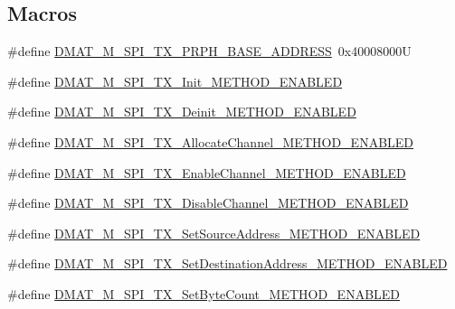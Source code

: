 \subsection*{Macros}
\begin{DoxyCompactItemize}
\item 
\#define \hyperlink{group___d_m_a_t___m___s_p_i___t_x__module_ga7a5e8ef1ce59e0e4c2a0d43bda518ae5}{D\-M\-A\-T\-\_\-\-M\-\_\-\-S\-P\-I\-\_\-\-T\-X\-\_\-\-P\-R\-P\-H\-\_\-\-B\-A\-S\-E\-\_\-\-A\-D\-D\-R\-E\-S\-S}~0x40008000\-U
\item 
\#define \hyperlink{group___d_m_a_t___m___s_p_i___t_x__module_gaebc972f6200b81ef32abe30c54acffbb}{D\-M\-A\-T\-\_\-\-M\-\_\-\-S\-P\-I\-\_\-\-T\-X\-\_\-\-Init\-\_\-\-M\-E\-T\-H\-O\-D\-\_\-\-E\-N\-A\-B\-L\-E\-D}
\item 
\#define \hyperlink{group___d_m_a_t___m___s_p_i___t_x__module_ga31d35c0e1df4d44d432f41e8b4aaeda8}{D\-M\-A\-T\-\_\-\-M\-\_\-\-S\-P\-I\-\_\-\-T\-X\-\_\-\-Deinit\-\_\-\-M\-E\-T\-H\-O\-D\-\_\-\-E\-N\-A\-B\-L\-E\-D}
\item 
\#define \hyperlink{group___d_m_a_t___m___s_p_i___t_x__module_gaf3808df46dd61db9302702ba2cdf30a6}{D\-M\-A\-T\-\_\-\-M\-\_\-\-S\-P\-I\-\_\-\-T\-X\-\_\-\-Allocate\-Channel\-\_\-\-M\-E\-T\-H\-O\-D\-\_\-\-E\-N\-A\-B\-L\-E\-D}
\item 
\#define \hyperlink{group___d_m_a_t___m___s_p_i___t_x__module_gaf6459aebab1f30b957070cf24f723359}{D\-M\-A\-T\-\_\-\-M\-\_\-\-S\-P\-I\-\_\-\-T\-X\-\_\-\-Enable\-Channel\-\_\-\-M\-E\-T\-H\-O\-D\-\_\-\-E\-N\-A\-B\-L\-E\-D}
\item 
\#define \hyperlink{group___d_m_a_t___m___s_p_i___t_x__module_ga89ea86f3b13941143f02f1d0e9e4044a}{D\-M\-A\-T\-\_\-\-M\-\_\-\-S\-P\-I\-\_\-\-T\-X\-\_\-\-Disable\-Channel\-\_\-\-M\-E\-T\-H\-O\-D\-\_\-\-E\-N\-A\-B\-L\-E\-D}
\item 
\#define \hyperlink{group___d_m_a_t___m___s_p_i___t_x__module_ga8427202e6dc67aa3783c4a1d49e6517f}{D\-M\-A\-T\-\_\-\-M\-\_\-\-S\-P\-I\-\_\-\-T\-X\-\_\-\-Set\-Source\-Address\-\_\-\-M\-E\-T\-H\-O\-D\-\_\-\-E\-N\-A\-B\-L\-E\-D}
\item 
\#define \hyperlink{group___d_m_a_t___m___s_p_i___t_x__module_ga2ea25e011642e13c84fcf05e45672e27}{D\-M\-A\-T\-\_\-\-M\-\_\-\-S\-P\-I\-\_\-\-T\-X\-\_\-\-Set\-Destination\-Address\-\_\-\-M\-E\-T\-H\-O\-D\-\_\-\-E\-N\-A\-B\-L\-E\-D}
\item 
\#define \hyperlink{group___d_m_a_t___m___s_p_i___t_x__module_ga018114df3e2091c553c6179fa2a4efe3}{D\-M\-A\-T\-\_\-\-M\-\_\-\-S\-P\-I\-\_\-\-T\-X\-\_\-\-Set\-Byte\-Count\-\_\-\-M\-E\-T\-H\-O\-D\-\_\-\-E\-N\-A\-B\-L\-E\-D}

\end{DoxyCompactItemize}
